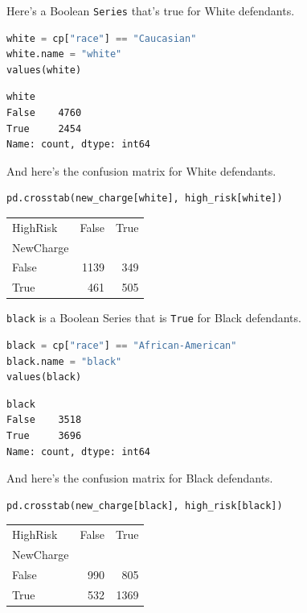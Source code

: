Here's a Boolean \passthrough{\lstinline!Series!} that's true for White
defendants.

\begin{lstlisting}[language=Python,style=source]
white = cp["race"] == "Caucasian"
white.name = "white"
values(white)
\end{lstlisting}

\begin{lstlisting}[style=output]
white
False    4760
True     2454
Name: count, dtype: int64
\end{lstlisting}

And here's the confusion matrix for White defendants.

\begin{lstlisting}[language=Python,style=source]
pd.crosstab(new_charge[white], high_risk[white])
\end{lstlisting}

\begin{tabular}{lrr}
\midrule
HighRisk & False & True \\
NewCharge &  &  \\
\midrule
False & 1139 & 349 \\
True & 461 & 505 \\
\midrule
\end{tabular}

\passthrough{\lstinline!black!} is a Boolean Series that is
\passthrough{\lstinline!True!} for Black defendants.

\begin{lstlisting}[language=Python,style=source]
black = cp["race"] == "African-American"
black.name = "black"
values(black)
\end{lstlisting}

\begin{lstlisting}[style=output]
black
False    3518
True     3696
Name: count, dtype: int64
\end{lstlisting}

And here's the confusion matrix for Black defendants.

\begin{lstlisting}[language=Python,style=source]
pd.crosstab(new_charge[black], high_risk[black])
\end{lstlisting}

\begin{tabular}{lrr}
\midrule
HighRisk & False & True \\
NewCharge &  &  \\
\midrule
False & 990 & 805 \\
True & 532 & 1369 \\
\midrule
\end{tabular}

